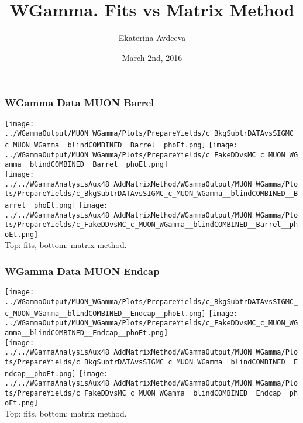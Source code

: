\documentclass{beamer}
\title{WGamma. Fits vs Matrix Method}
\author{Ekaterina Avdeeva}
\institute{University of Nebraska - Lincoln}
\date{March 2nd, 2016}
\begin{document}
\begin{frame}
\titlepage
\end{frame}

\begin{frame}\frametitle{WGamma Data MUON Barrel}
  \texttt{[image: ../WGammaOutput/MUON\_WGamma/Plots/PrepareYields/c\_BkgSubtrDATAvsSIGMC\_c\_MUON\_WGamma\_\_blindCOMBINED\_\_Barrel\_\_phoEt.png]} \texttt{[image: ../WGammaOutput/MUON\_WGamma/Plots/PrepareYields/c\_FakeDDvsMC\_c\_MUON\_WGamma\_\_blindCOMBINED\_\_Barrel\_\_phoEt.png]}\\
  \texttt{[image: ../../WGammaAnalysisAux48\_AddMatrixMethod/WGammaOutput/MUON\_WGamma/Plots/PrepareYields/c\_BkgSubtrDATAvsSIGMC\_c\_MUON\_WGamma\_\_blindCOMBINED\_\_Barrel\_\_phoEt.png]} \texttt{[image: ../../WGammaAnalysisAux48\_AddMatrixMethod/WGammaOutput/MUON\_WGamma/Plots/PrepareYields/c\_FakeDDvsMC\_c\_MUON\_WGamma\_\_blindCOMBINED\_\_Barrel\_\_phoEt.png]}\\
  \scriptsize Top: fits, bottom: matrix method.
\end{frame}

\begin{frame}\frametitle{WGamma Data MUON Endcap}
  \texttt{[image: ../WGammaOutput/MUON\_WGamma/Plots/PrepareYields/c\_BkgSubtrDATAvsSIGMC\_c\_MUON\_WGamma\_\_blindCOMBINED\_\_Endcap\_\_phoEt.png]} \texttt{[image: ../WGammaOutput/MUON\_WGamma/Plots/PrepareYields/c\_FakeDDvsMC\_c\_MUON\_WGamma\_\_blindCOMBINED\_\_Endcap\_\_phoEt.png]}\\
  \texttt{[image: ../../WGammaAnalysisAux48\_AddMatrixMethod/WGammaOutput/MUON\_WGamma/Plots/PrepareYields/c\_BkgSubtrDATAvsSIGMC\_c\_MUON\_WGamma\_\_blindCOMBINED\_\_Endcap\_\_phoEt.png]} \texttt{[image: ../../WGammaAnalysisAux48\_AddMatrixMethod/WGammaOutput/MUON\_WGamma/Plots/PrepareYields/c\_FakeDDvsMC\_c\_MUON\_WGamma\_\_blindCOMBINED\_\_Endcap\_\_phoEt.png]}\\
  \scriptsize Top: fits, bottom: matrix method.
\end{frame}
\end{document}
